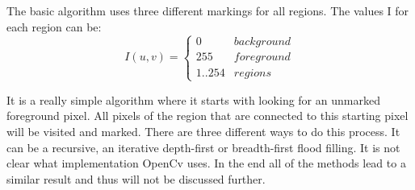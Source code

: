 The basic algorithm uses three different markings for all regions. The values I for each region can be:
\begin{equation}I(u,v) = \begin{cases} 0 & background \\  255 & foreground \\ 1..254 & regions \end{cases} \end{equation}

It is a really simple algorithm where it starts with looking for an unmarked foreground pixel. All pixels of the region that are connected to this starting pixel will be visited and marked. There are three different ways to do this process. It can be a recursive, an iterative depth-first or breadth-first flood filling. It is not clear what implementation OpenCv uses. In the end all of the methods lead to a similar result and thus will not be discussed further. 

